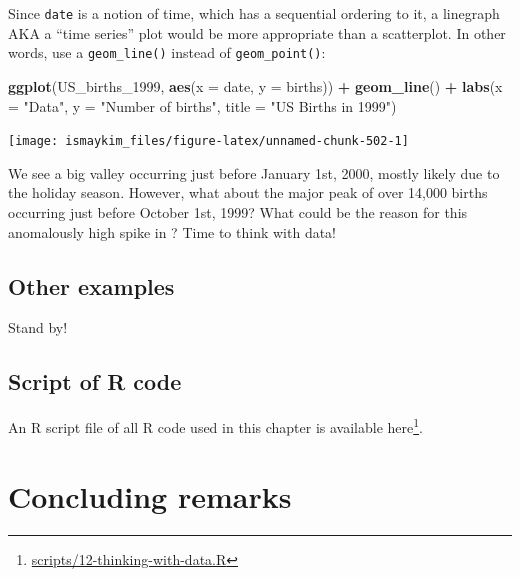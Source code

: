 \documentclass[12pt, krantz2,]{krantz}
\makeatletter
\newenvironment{Shaded}{\begin{snugshade}}{\end{snugshade}}
\newcommand{\DataTypeTok}[1]{\textcolor[rgb]{0.27,0.27,0.27}{#1}}
\newcommand{\DecValTok}[1]{\textcolor[rgb]{0.06,0.06,0.06}{#1}}
\newcommand{\KeywordTok}[1]{\textcolor[rgb]{0.27,0.27,0.27}{\textbf{#1}}}
\newcommand{\NormalTok}[1]{#1}
\newcommand{\OperatorTok}[1]{\textcolor[rgb]{0.43,0.43,0.43}{\textbf{#1}}}
\newcommand{\StringTok}[1]{\textcolor[rgb]{0.5,0.5,0.5}{#1}}
\renewcommand{\href}[2]{#2\footnote{\url{#1}}}
\newenvironment{kframe}{%
\medskip{}
\setlength{\fboxsep}{.8em}
 \def\at@end@of@kframe{}%
 \ifinner\ifhmode%
  \def\at@end@of@kframe{\end{minipage}}%
  \begin{minipage}{\columnwidth}%
 \fi\fi%
 \def\FrameCommand##1{\hskip\@totalleftmargin \hskip-\fboxsep
 \colorbox{shadecolor}{##1}\hskip-\fboxsep
     \hskip-\linewidth \hskip-\@totalleftmargin \hskip\columnwidth}%
 \MakeFramed {\advance\hsize-\width
   \@totalleftmargin\z@ \linewidth\hsize
   \@setminipage}}%
 {\par\unskip\endMakeFramed%
 \at@end@of@kframe}
\renewenvironment{Shaded}{\begin{kframe}}{\end{kframe}}
\makeatother
\begin{document}
Since \texttt{date} is a notion of time, which has a sequential ordering to it, a linegraph AKA a ``time series'' plot would be more appropriate than a scatterplot. In other words, use a \texttt{geom\_line()} instead of \texttt{geom\_point()}:

\begin{Shaded}
\begin{Highlighting}[]
\KeywordTok{ggplot}\NormalTok{(US_births_}\DecValTok{1999}\NormalTok{, }\KeywordTok{aes}\NormalTok{(}\DataTypeTok{x =}\NormalTok{ date, }\DataTypeTok{y =}\NormalTok{ births)) }\OperatorTok{+}
\StringTok{  }\KeywordTok{geom_line}\NormalTok{() }\OperatorTok{+}
\StringTok{  }\KeywordTok{labs}\NormalTok{(}\DataTypeTok{x =} \StringTok{"Data"}\NormalTok{, }\DataTypeTok{y =} \StringTok{"Number of births"}\NormalTok{, }\DataTypeTok{title =} \StringTok{"US Births in 1999"}\NormalTok{)}
\end{Highlighting}
\end{Shaded}

\begin{center}\texttt{[image: ismaykim\_files/figure-latex/unnamed-chunk-502-1]} \end{center}

We see a big valley occurring just before January 1st, 2000, mostly likely due to the holiday season. However, what about the major peak of over 14,000 births occurring just before October 1st, 1999? What could be the reason for this anomalously high spike in ? Time to think with data!

\hypertarget{other-examples}{%
\subsection{Other examples}\label{other-examples}}

Stand by!

\hypertarget{script-of-r-code-1}{%
\subsection{Script of R code}\label{script-of-r-code-1}}

An R script file of all R code used in this chapter is available \href{scripts/12-thinking-with-data.R}{here}.

\hypertarget{concluding-remarks}{%
\section*{Concluding remarks}\label{concluding-remarks}}
\end{document}
